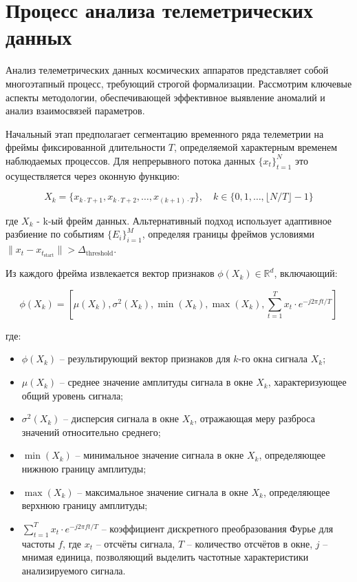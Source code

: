\section{Процесс анализа телеметрических данных}

Анализ телеметрических данных космических аппаратов представляет собой
многоэтапный процесс, требующий строгой формализации. Рассмотрим ключевые
аспекты методологии, обеспечивающей эффективное выявление аномалий и анализ
взаимосвязей параметров.

Начальный этап предполагает сегментацию временного ряда телеметрии на фреймы
фиксированной длительности $T$, определяемой характерным временем наблюдаемых
процессов. Для непрерывного потока данных $\{x_t\}_{t=1}^N$ это осуществляется
через оконную функцию:

\[
	X_k = \{x_{k \cdot T + 1}, x_{k \cdot T + 2}, \ldots, x_{(k+1) \cdot T}\}, \quad k \in \{0, 1, \ldots, \lfloor N/T \rfloor - 1\}
\]

где $X_k$ - k-ый фрейм данных. Альтернативный подход использует адаптивное
разбиение по событиям $\{E_i\}_{i=1}^M$, определяя границы фреймов условиями
$\|x_t - x_{t_{\text{start}}}\| > \Delta_{\text{threshold}}$.

Из каждого фрейма извлекается вектор признаков $\phi(X_k) \in \mathbb{R}^d$, включающий:

\[
	\phi(X_k) = \left[\mu(X_k), \sigma^2(X_k), \min(X_k), \max(X_k), \sum_{t=1}^T x_t \cdot e^{-j2\pi ft/T}\right]
\]

\noindent где:
\begin{itemize}
	\item $\phi(X_k)$ -- результирующий вектор признаков для $k$-го окна сигнала $X_k$;
	\item $\mu(X_k)$ -- среднее значение амплитуды сигнала в окне $X_k$, характеризующее общий уровень сигнала;
	\item $\sigma^2(X_k)$ -- дисперсия сигнала в окне $X_k$, отражающая меру разброса значений относительно среднего;
	\item $\min(X_k)$ -- минимальное значение сигнала в окне $X_k$, определяющее нижнюю границу амплитуды;
	\item $\max(X_k)$ -- максимальное значение сигнала в окне $X_k$, определяющее верхнюю границу амплитуды;
	\item $\sum_{t=1}^T x_t \cdot e^{-j2\pi ft/T}$ -- коэффициент дискретного преобразования Фурье для частоты $f$, где $x_t$ -- отсчёты сигнала, $T$ -- количество отсчётов в окне, $j$ -- мнимая единица, позволяющий выделить частотные характеристики анализируемого сигнала.
\end{itemize}

